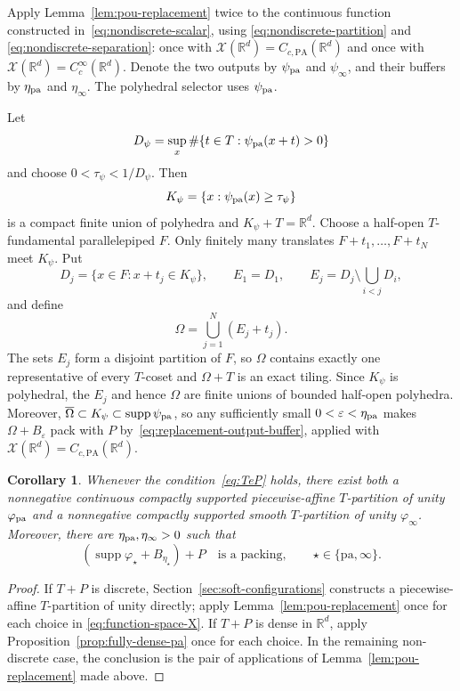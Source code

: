 \documentclass[11pt,reqno]{amsart}
\numberwithin{equation}{section}
\newtheorem{corollary}[theorem]{Corollary}
\theoremstyle{definition}
\theoremstyle{remark}
\newcommand{\R}{\mathbb R}
\newcommand{\supp}{\operatorname{supp}}
\begin{document}
Apply Lemma~\ref{lem:pou-replacement} twice to the continuous function
constructed in~\eqref{eq:nondiscrete-scalar}, using
\eqref{eq:nondiscrete-partition} and
\eqref{eq:nondiscrete-separation}: once with
$\mathcal X(\R^d)=C_{c,\mathrm{PA}}(\R^d)$ and once with
$\mathcal X(\R^d)=C_c^\infty(\R^d)$.  Denote the two outputs by
$\psi_{\rm pa}$ and $\psi_\infty$, and their buffers by
$\eta_{\rm pa}$ and $\eta_\infty$.  The polyhedral selector uses
$\psi_{\rm pa}$.

Let
\[
 D_\psi=\sup_x\#\{t\in T:\psi_{\rm pa}(x+t)>0\}
\]
and choose $0<\tau_\psi<1/D_\psi$.  Then
\[
 K_\psi=\{x:\psi_{\rm pa}(x)\ge\tau_\psi\}
\]
is a compact finite union of polyhedra and $K_\psi+T=\R^d$.  Choose a
half-open $T$-fundamental parallelepiped $F$.  Only finitely many translates
$F+t_1,\ldots,F+t_N$ meet $K_\psi$.  Put
\[
 D_j=\{x\in F:x+t_j\in K_\psi\},
 \qquad
 E_1=D_1,
 \qquad
 E_j=D_j\setminus\bigcup_{i<j}D_i,
\]
and define
\begin{equation}\label{eq:nondiscrete-polyhedral-selector}
 \Omega=\bigcup_{j=1}^N(E_j+t_j).
\end{equation}
The sets $E_j$ form a disjoint partition of $F$, so $\Omega$ contains
exactly one representative of every $T$-coset and $\Omega+T$ is an exact
tiling.  Since $K_\psi$ is polyhedral, the $E_j$ and hence $\Omega$ are
finite unions of bounded half-open polyhedra.  Moreover,
$\overline\Omega\subset K_\psi\subset\supp\psi_{\rm pa}$, so any sufficiently small
$0<\varepsilon<\eta_{\rm pa}$ makes $\Omega+B_\varepsilon$ pack with
$P$ by~\eqref{eq:replacement-output-buffer}, applied with
$\mathcal X(\R^d)=C_{c,\mathrm{PA}}(\R^d)$.

\begin{corollary}\label{cor:global-partitions}
Whenever the condition~\eqref{eq:TeP} holds, there exist both a nonnegative
continuous compactly supported piecewise-affine $T$-partition of unity
$\varphi_{\rm pa}$ and a nonnegative compactly supported smooth
$T$-partition of unity $\varphi_\infty$.  Moreover, there are
$\eta_{\rm pa},\eta_\infty>0$ such that
\[
 (\supp\varphi_\star+B_{\eta_\star})+P
 \quad\text{is a packing},
 \qquad \star\in\{\mathrm{pa},\infty\}.
\]
\end{corollary}

\begin{proof}
If $T+P$ is discrete, Section~\ref{sec:soft-configurations} constructs a
piecewise-affine $T$-partition of unity directly; apply
Lemma~\ref{lem:pou-replacement} once for each choice in
\eqref{eq:function-space-X}.  If $T+P$ is dense in $\R^d$, apply
Proposition~\ref{prop:fully-dense-pa} once for each choice.  In the remaining
non-discrete case, the conclusion is the pair of applications of
Lemma~\ref{lem:pou-replacement} made above.
\end{proof}
\end{document}
